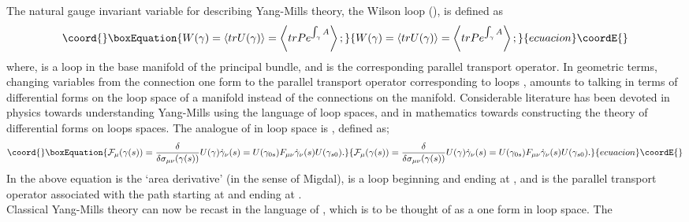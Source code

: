 \documentclass[a4paper,12]{article}
\begin{document}
 The natural gauge invariant variable for describing 
Yang-Mills theory, the Wilson loop (\coordHE{}), is defined as 
\begin{equation}\coord{}\boxEquation{
W(\gamma 
) 
= \left<tr U(\gamma )\right> = \left<tr P e^{\int_{\gamma }A} 
\right>\nonumber;
}{
W(\gamma 
) 
= \left<tr U(\gamma )\right> = \left<tr P e^{\int_{\gamma }A} 
\right>\nonumber;
}{ecuacion}\coordE{}\end{equation} 
where, \myHighlight{$\gamma $}\coordHE{} is a loop in the base manifold of the principal 
bundle, and 
\coordHE{}  is the corresponding parallel transport operator. In 
geometric terms, changing variables from the connection one form \coordHE{} to 
the parallel transport operator corresponding to loops \coordHE{}, 
amounts to talking in terms of differential forms on the loop space of a 
manifold instead of the connections on the manifold. Considerable 
literature has been devoted in physics\cite{Migdal1, Polyakov:glue, MME1, 
MME2, Loopspace, gambini1, gambini2, Yaffe1} towards understanding 
Yang-Mills 
using the language of loop spaces, and in mathematics\cite{chen1, chen2, 
chen3} towards constructing 
the theory of differential forms on loops spaces. The analogue of \coordHE{} in loop space is \coordHE{}, defined as;
\begin{equation}\coord{}\boxEquation{
{\cal{F }}_\mu (\gamma (s)) = \frac{\delta }{\delta \sigma _{\mu \nu 
}(\gamma (s))}U(\gamma )\dot{\gamma }_\nu (s) = U(\gamma _{0s})F_{\mu \nu 
}\dot{\gamma }_\nu (s)U(\gamma _{s0}).
}{
{\cal{F }}_\mu (\gamma (s)) = \frac{\delta }{\delta \sigma _{\mu \nu 
}(\gamma (s))}U(\gamma )\dot{\gamma }_\nu (s) = U(\gamma _{0s})F_{\mu \nu 
}\dot{\gamma }_\nu (s)U(\gamma _{s0}).
}{ecuacion}\coordE{}\end{equation}
In the above equation \coordHE{} is the `area derivative' (in the sense of Migdal\cite{Migdal1, 
MME1, MME2}), \myHighlight{$\gamma $}\coordHE{} is a 
loop beginning and ending at \coordHE{}, and \coordHE{} is the 
parallel transport operator associated with the path starting at \coordHE{} and ending at \coordHE{}.\\
Classical Yang-Mills theory can now be recast in the language of \coordHE{}, which is to be thought of as a one form in loop space. The 
\end{document}
